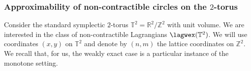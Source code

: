 

\subsubsection{Approximability of non-contractible circles on the $2$-torus}
Consider the standard symplectic $2$-torus $\mathbb{T}^2=\mathbb{R}^2/\mathbb{Z}^2$ with unit volume. We are interested in the class of non-contractible Lagrangians $\lagwex(\mathbb{T}^2)$. We will use coordinates $(x,y)$ on $\mathbb{T}^2$ and denote by $(n,m)$ the lattice coordinates on $\mathbb{Z}^2$. We recall that, for us, the weakly exact case is a particular instance of the monotone setting. %

